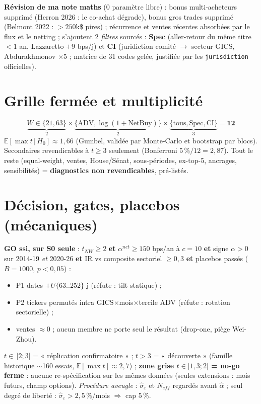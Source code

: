 \documentclass[10pt,a4paper,twocolumn]{article}
\begin{document}
\textbf{Révision de ma note maths} (0 paramètre libre) : bonus multi-acheteurs \textcolor{rouge}{supprimé} (Herron 2026 : le co-achat dégrade), bonus gros trades \textcolor{rouge}{supprimé} (Belmont 2022 : $>250$k\$ pires) ; récurrence et ventes récentes absorbées par le flux et le netting ; s'ajoutent 2 \emph{filtres} sourcés : \textbf{Spec} (aller-retour du même titre $<1$ an, Lazzaretto $+9$ bps/j) et \textbf{CI} (juridiction comité $\to$ secteur GICS, Abdurakhmonov $\times5$ ; matrice de 31 codes gelée, justifiée par les \texttt{jurisdiction} officielles).

\section{Grille fermée et multiplicité}
\[
\underbrace{W\in\{21,63\}}_{2}\times\underbrace{\{\mathrm{ADV},\log(1{+}\mathrm{NetBuy})\}}_{2}\times\underbrace{\{\text{tous},\mathrm{Spec},\mathrm{CI}\}}_{3}=\mathbf{12}
\]
$\mathbb{E}[\max t\,|\,H_0]\approx1{,}66$ (Gumbel, validée par Monte-Carlo et bootstrap par blocs). Secondaires revendicables à $t\geq3$ seulement (Bonferroni $5\,\%/12=2{,}87$). Tout le reste (equal-weight, ventes, House/Sénat, sous-périodes, ex-top-5, ancrages, sensibilités) = \textbf{diagnostics non revendicables}, pré-listés.

\section{Décision, gates, placebos (mécaniques)}
\textbf{GO ssi, sur S0 seule} : $t_{NW}\geq2$ \textbf{et} $\alpha^{net}\geq150$ bps/an à $c{=}10$ \textbf{et} signe $\alpha>0$ sur 2014-19 \emph{et} 2020-26 \textbf{et} IR vs composite sectoriel $\geq0{,}3$ \textbf{et} placebos passés ($B{=}1000$, $p<0{,}05$) :
\begin{itemize}
  \item P1 dates $+U\{63..252\}$ j (réfute : tilt statique) ;
  \item P2 tickers permutés intra GICS$\times$mois$\times$tercile ADV (réfute : rotation sectorielle) ;
  \item ventes $\approx0$ ; aucun membre ne porte seul le résultat (drop-one, piège Wei-Zhou).
\end{itemize}
$t\in\,]2;3]$ = « réplication confirmatoire » ; $t>3$ = « découverte » (famille historique $\sim$160 essais, $\mathbb{E}[\max t]\approx2{,}7$) ; \textbf{zone grise $t\in[1{,}3;2[$ = no-go ferme} : aucune re-spécification sur les mêmes données (seules extensions : mois futurs, champ options).
\emph{Procédure aveugle} : $\hat\sigma_\varepsilon$ et $N_{eff}$ regardés avant $\hat\alpha$ ; seul degré de liberté : $\hat\sigma_\varepsilon>2{,}5\,\%$/mois $\Rightarrow$ cap $5\,\%$.
\end{document}
